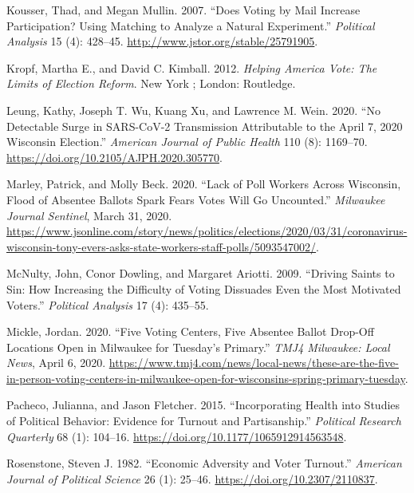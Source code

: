\documentclass[
  12pt,
]{article}
\newlength{\cslhangindent}
\newenvironment{cslreferences}%
  {\setlength{\parindent}{0pt}%
  \everypar{\setlength{\hangindent}{\cslhangindent}}\ignorespaces}%
  {\par}
\begin{document}
\begin{cslreferences}
\leavevmode\hypertarget{ref-Kousser2007}{}%
Kousser, Thad, and Megan Mullin. 2007. ``Does Voting by Mail Increase Participation? Using Matching to Analyze a Natural Experiment.'' \emph{Political Analysis} 15 (4): 428--45. \url{http://www.jstor.org/stable/25791905}.

\leavevmode\hypertarget{ref-Kropf2012}{}%
Kropf, Martha E., and David C. Kimball. 2012. \emph{Helping America Vote: The Limits of Election Reform}. New York ; London: Routledge.

\leavevmode\hypertarget{ref-Leung2020}{}%
Leung, Kathy, Joseph T. Wu, Kuang Xu, and Lawrence M. Wein. 2020. ``No Detectable Surge in SARS-CoV-2 Transmission Attributable to the April 7, 2020 Wisconsin Election.'' \emph{American Journal of Public Health} 110 (8): 1169--70. \url{https://doi.org/10.2105/AJPH.2020.305770}.

\leavevmode\hypertarget{ref-Marley2020}{}%
Marley, Patrick, and Molly Beck. 2020. ``Lack of Poll Workers Across Wisconsin, Flood of Absentee Ballots Spark Fears Votes Will Go Uncounted.'' \emph{Milwaukee Journal Sentinel}, March 31, 2020. \url{https://www.jsonline.com/story/news/politics/elections/2020/03/31/coronavirus-wisconsin-tony-evers-asks-state-workers-staff-polls/5093547002/}.

\leavevmode\hypertarget{ref-McNulty2009}{}%
McNulty, John, Conor Dowling, and Margaret Ariotti. 2009. ``Driving Saints to Sin: How Increasing the Difficulty of Voting Dissuades Even the Most Motivated Voters.'' \emph{Political Analysis} 17 (4): 435--55.

\leavevmode\hypertarget{ref-Mickle2020}{}%
Mickle, Jordan. 2020. ``Five Voting Centers, Five Absentee Ballot Drop-Off Locations Open in Milwaukee for Tuesday's Primary.'' \emph{TMJ4 Milwaukee: Local News}, April 6, 2020. \url{https://www.tmj4.com/news/local-news/these-are-the-five-in-person-voting-centers-in-milwaukee-open-for-wisconsins-spring-primary-tuesday}.

\leavevmode\hypertarget{ref-Pacheco2015}{}%
Pacheco, Julianna, and Jason Fletcher. 2015. ``Incorporating Health into Studies of Political Behavior: Evidence for Turnout and Partisanship.'' \emph{Political Research Quarterly} 68 (1): 104--16. \url{https://doi.org/10.1177/1065912914563548}.

\leavevmode\hypertarget{ref-Rosenstone1982}{}%
Rosenstone, Steven J. 1982. ``Economic Adversity and Voter Turnout.'' \emph{American Journal of Political Science} 26 (1): 25--46. \url{https://doi.org/10.2307/2110837}.


\end{cslreferences}
\end{document}
